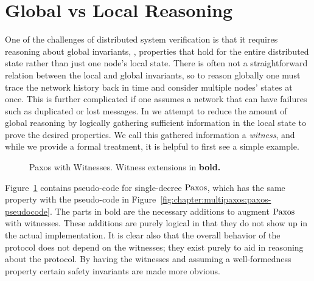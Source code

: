 \section{Global vs Local Reasoning}
\label{chapter:witnesspassing:sec:global-local-reasoning}

One of the challenges of distributed system verification is that it requires reasoning about
global invariants, \ie, properties that hold for the entire distributed state rather than just
one node's local state.
There is often not a straightforward relation between the local and global invariants, so
to reason globally one must trace the network history back in time and consider multiple
nodes' states at once.
This is further complicated if one assumes a network that can have failures such as duplicated
or lost messages.
In \sysname{} we attempt to reduce the amount of global reasoning by logically gathering sufficient
information in the local state to prove the desired properties.
We call this gathered information a \textit{witness}, and while we provide a formal treatment, it is helpful to first see a simple example.

\begin{figure}
\begin{minipage}{\linewidth}
\noindent
\begin{multicols}{2}
  
\end{multicols}
\end{minipage}
\caption{Paxos with Witnesses. Witness extensions in \bfseries{bold}.}
\label{fig:chapter:witnesspassing:paxos-witness}
\end{figure}

Figure~\ref{fig:chapter:witnesspassing:paxos-witness} contains pseudo-code for single-decree $\mathrm{Paxos}$,
which has the same property with the pseudo-code in Figure~\ref{fig:chapter:multipaxos:paxos-pseudocode}.
The parts in bold are the necessary additions to augment $\mathrm{Paxos}$ with witnesses.
These additions are purely logical in that they do not show up in the actual implementation.
It is clear also that the overall behavior of the protocol does not depend on the witnesses;
they exist purely to aid in reasoning about the protocol.
By having the witnesses and assuming a well-formedness property certain safety invariants are
made more obvious.


